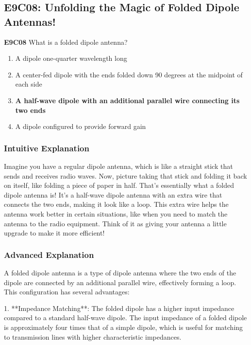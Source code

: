 \subsection{E9C08: Unfolding the Magic of Folded Dipole Antennas!}

\begin{tcolorbox}[colback=gray!10!white,colframe=black!75!black,title=Question E9C08]
\textbf{E9C08} What is a folded dipole antenna?
\begin{enumerate}[label=\Alph*)]
    \item A dipole one-quarter wavelength long
    \item A center-fed dipole with the ends folded down 90 degrees at the midpoint of each side
    \item \textbf{A half-wave dipole with an additional parallel wire connecting its two ends}
    \item A dipole configured to provide forward gain
\end{enumerate}
\end{tcolorbox}

\subsubsection{Intuitive Explanation}
Imagine you have a regular dipole antenna, which is like a straight stick that sends and receives radio waves. Now, picture taking that stick and folding it back on itself, like folding a piece of paper in half. That’s essentially what a folded dipole antenna is! It’s a half-wave dipole antenna with an extra wire that connects the two ends, making it look like a loop. This extra wire helps the antenna work better in certain situations, like when you need to match the antenna to the radio equipment. Think of it as giving your antenna a little upgrade to make it more efficient!

\subsubsection{Advanced Explanation}
A folded dipole antenna is a type of dipole antenna where the two ends of the dipole are connected by an additional parallel wire, effectively forming a loop. This configuration has several advantages:

1. **Impedance Matching**: The folded dipole has a higher input impedance compared to a standard half-wave dipole. The input impedance of a folded dipole is approximately four times that of a simple dipole, which is useful for matching to transmission lines with higher characteristic impedances.

